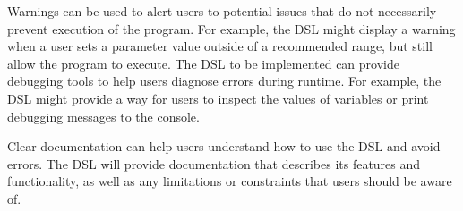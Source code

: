 Warnings can be used to alert users to potential issues that do not 
necessarily prevent execution of the program. For example, the DSL 
might display a warning when a user sets a parameter value outside 
of a recommended range, but still allow the program to execute.
The DSL to be implemented can provide debugging tools to help users diagnose errors during runtime. For example, the DSL might provide a way for users to inspect the values of variables or print debugging messages to the console.

Clear documentation can help users understand how to use the DSL 
and avoid errors. The DSL will provide documentation that 
describes its features and functionality, as well as any 
limitations or constraints that users should be aware of.
